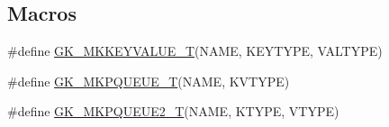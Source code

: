 \subsection*{Macros}
\begin{DoxyCompactItemize}
\item 
\#define \hyperlink{a00080_ad11341707bef5a28f3747df28e8e5a8a}{G\+K\+\_\+\+M\+K\+K\+E\+Y\+V\+A\+L\+U\+E\+\_\+T}(N\+A\+ME,  K\+E\+Y\+T\+Y\+PE,  V\+A\+L\+T\+Y\+PE)
\item 
\#define \hyperlink{a00080_a57b321ad0a72d8cbe45cfe882aee7b2f}{G\+K\+\_\+\+M\+K\+P\+Q\+U\+E\+U\+E\+\_\+T}(N\+A\+ME,  K\+V\+T\+Y\+PE)
\item 
\#define \hyperlink{a00080_ad8628d4aab6d4dbf453f097bc493c152}{G\+K\+\_\+\+M\+K\+P\+Q\+U\+E\+U\+E2\+\_\+T}(N\+A\+ME,  K\+T\+Y\+PE,  V\+T\+Y\+PE)
\end{DoxyCompactItemize}
